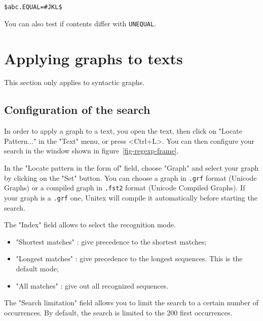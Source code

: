 \bigskip
\noindent \verb+$abc.EQUAL=#JKL$+

\bigskip
\noindent You can also test if contents differ with \verb+UNEQUAL+.
\section{Applying graphs to texts}
\label{section-applying-graphs-to-text}
This section only applies to syntactic graphs.
\subsection{Configuration of the search}
In order to apply a graph to a text, you open the text, then click on "Locate
Pattern..." in the "Text" menu, or press <Ctrl+L>. You can then configure your
search in the window shown in figure~\ref{fig-regexp-frame}.

\bigskip
{}
\noindent In the "Locate pattern in the form of" field, choose "Graph" and
select your graph by clicking on the "Set" button. You can choose a graph in \verb+.grf+
format (Unicode Graphs) or a compiled graph in \verb+.fst2+ format (Unicode
Compiled Graphs). If your graph is a \verb+.grf+ one, Unitex will compile it
automatically before starting the search.

\bigskip
\noindent The "Index" field allows to select the recognition mode.

\bigskip
{}
\begin{itemize}
  \item "Shortest matches" : give precedence to the shortest matches;
  \item "Longest matches" : give precedence to the longest sequences. This is the
  default mode;
  \item "All matches" : give out all recognized sequences.
\end{itemize}

\bigskip
\noindent 
The "Search limitation" field allows you to limit the search to a certain number of
occurrences. By default, the search is limited to the 200 first
occurrences.


